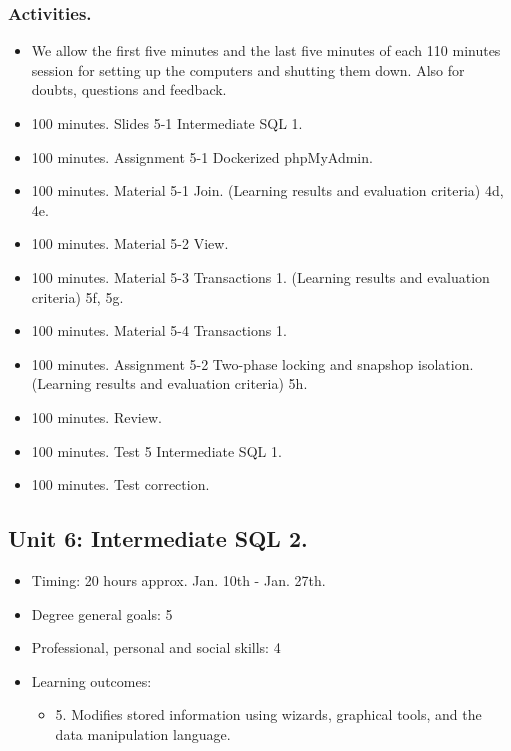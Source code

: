 \documentclass[catalan, a4paper, 12pt, titlepage]{article}
\begin{document}
  \subsubsection{Activities.}

  \begin{itemize}
          \item We allow the first five minutes and the last five minutes of each 110 minutes session for setting up the computers and shutting them down. Also for doubts, questions and feedback.
	  \item 100 minutes. Slides 5-1 Intermediate SQL 1.
	  \item 100 minutes. Assignment 5-1 Dockerized phpMyAdmin.
	  \item 100 minutes. Material 5-1 Join. (\faGraduationCap Learning results and evaluation criteria) 4d, 4e.
	  \item 100 minutes. Material 5-2 View.
	  \item 100 minutes. Material 5-3 Transactions 1. (\faGraduationCap Learning results and evaluation criteria) 5f, 5g.
	  \item 100 minutes. Material 5-4 Transactions 1.
	  \item 100 minutes. Assignment 5-2 Two-phase locking and snapshop isolation. (\faGraduationCap Learning results and evaluation criteria) 5h.
	  \item 100 minutes. Review.
	  \item 100 minutes. Test 5 Intermediate SQL 1.
	  \item 100 minutes. Test correction.
  \end{itemize}

  \subsection{Unit 6: Intermediate SQL 2.}

  \begin{itemize}
	\item Timing: 20 hours approx. Jan. 10th - Jan. 27th.
	\item Degree general goals: 5
	\item Professional, personal and social skills: 4
	\item Learning outcomes: 
		\begin{itemize}
			\item 5. Modifies stored information using wizards, graphical tools, and the data manipulation language.
		\end{itemize}
  \end{itemize}
  
\end{document}
